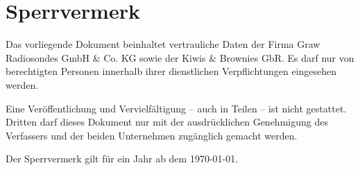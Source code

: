 \newpage


\section*{Sperrvermerk}
Das vorliegende Dokument beinhaltet vertrauliche Daten der Firma Graw Radiosondes GmbH \& Co. KG sowie der Kiwis \& Brownies GbR.
Es darf nur von berechtigten Personen innerhalb ihrer dienstlichen Verpflichtungen eingesehen werden.

Eine Veröffentlichung und Vervielfältigung – auch in Teilen – ist nicht gestattet.
Dritten darf dieses Dokument nur mit der ausdrücklichen Genehmigung des Verfassers und der beiden Unternehmen zugänglich gemacht werden.

Der Sperrvermerk gilt für ein Jahr ab dem \today.
